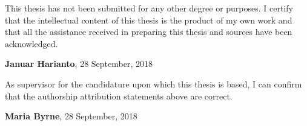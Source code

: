 This thesis has not been submitted for any other degree or purposes. I certify that the intellectual content of this thesis is the product of my own work and that all the assistance received in preparing this thesis and sources have been acknowledged.

\vspace{12mm}
\textbf{Januar Harianto}, 28 September, 2018

\vspace{3.14mm}

As supervisor for the candidature upon which this thesis is based, I can confirm that the authorship attribution statements above are correct.

\vspace{12mm}
\textbf{Maria Byrne}, 28 September, 2018




\cleardoublepage
